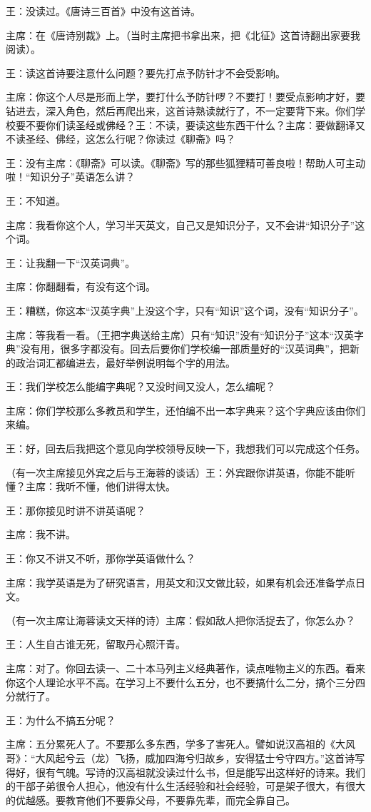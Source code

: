 王：没读过。《唐诗三百首》中没有这首诗。

主席：在《唐诗别裁》上。（当时主席把书拿出来，把《北征》这首诗翻出家要我阅读）。

王：读这首诗要注意什么问题？要先打点予防针才不会受影响。

主席：你这个人尽是形而上学，要打什么予防针啰？不要打！要受点影响才好，要钻进去，深入角色，然后再爬出来，这首诗熟读就行了，不一定要背下来。你们学校要不要你们读圣经或佛经？王：不读，要读这些东西干什么？主席：要做翻译又不读圣经、佛经，这怎么行呢？你读过《聊斋》吗？

王：没有主席：《聊斋》可以读。《聊斋》写的那些狐狸精可善良啦！帮助人可主动啦！“知识分子”英语怎么讲？

王：不知道。

主席：我看你这个人，学习半天英文，自己又是知识分子，又不会讲“知识分子”这个词。

王：让我翻一下“汉英词典”。

主席：你翻翻看，有没有这个词。

王：糟糕，你这本“汉英字典”上没这个字，只有“知识”这个词，没有“知识分子”。

主席：等我看一看。（王把字典送给主席）只有“知识”没有“知识分子”这本“汉英字典”没有用，很多字都没有。回去后要你们学校编一部质量好的“汉英词典”，把新的政治词汇都编进去，最好举例说明每个字的用法。

王：我们学校怎么能编字典呢？又没时间又没人，怎么编呢？

主席：你们学校那么多教员和学生，还怕编不出一本字典来？这个字典应该由你们来编。

王：好，回去后我把这个意见向学校领导反映一下，我想我们可以完成这个任务。

（有一次主席接见外宾之后与王海蓉的谈话）王：外宾跟你讲英语，你能不能听懂？主席：我听不懂，他们讲得太快。

王：那你接见时讲不讲英语呢？

主席：我不讲。

王：你又不讲又不听，那你学英语做什么？

主席：我学英语是为了研究语言，用英文和汉文做比较，如果有机会还准备学点日文。

（有一次主席让海蓉读文天祥的诗）主席：假如敌人把你活捉去了，你怎么办？

王：人生自古谁无死，留取丹心照汗青。

主席：对了。你回去读一、二十本马列主义经典著作，读点唯物主义的东西。看来你这个人理论水平不高。在学习上不要什么五分，也不要搞什么二分，搞个三分四分就行了。

王：为什么不搞五分呢？

主席：五分累死人了。不要那么多东西，学多了害死人。譬如说汉高祖的《大风哥》：“大风起兮云（龙）飞扬，威加四海兮归故乡，安得猛士兮守四方。”这首诗写得好，很有气魄。写诗的汉高祖就没读过什么书，但是能写出这样好的诗来。我们的干部子弟很令人担心，他没有什么生活经验和社会经验，可是架子很大，有很大的优越感。要教育他们不要靠父母，不要靠先辈，而完全靠自己。


